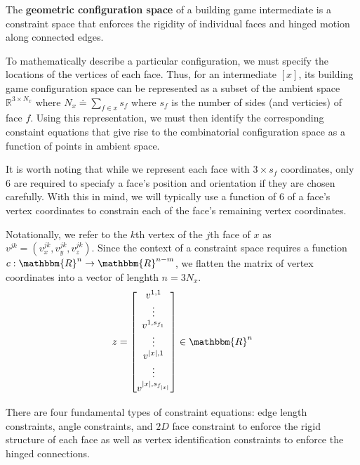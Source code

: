 \begin{mydef}
The \textbf{geometric configuration space} of a building game intermediate is a constraint space that enforces the rigidity of individual faces and hinged motion along connected edges.
\end{mydef}

To mathematically describe a particular configuration, we must specify the locations of the vertices of each face. Thus, for an intermediate $[x]$, its building game configuration space can be represented as a subset of the ambient space $\mathbb{R}^{3\times N_x}$ where $N_x \doteq \sum_{f\in x} s_f$ where $s_f$ is the number of sides (and verticies) of face $f$. Using this representation, we must then identify the corresponding constaint equations that give rise to the combinatorial configuration space as a function of points in ambient space. 

It is worth noting that while we represent each face with $3\times s_f$ coordinates, only 6 are required to speciafy a face's position and orientation if they are chosen carefully. With this in mind, we will typically use a function of $6$ of a face's vertex coordinates to constrain each of the face's remaining vertex coordinates. 


Notationally, we refer to the $k$th vertex of the $j$th face of $x$ as $v^{jk} = \left(v^{jk}_x,v^{jk}_y,v^{jk}_z\right)$.
Since the context of a constraint space requires a function $c: \mathbbm{R}^n \to \mathbbm{R}^{n-m}$, we flatten the matrix of vertex coordinates into a vector of lenghth $n = 3N_x$. 
\begin{align}
z = \begin{bmatrix} v^{1,1} \\ \vdots \\ v^{1,s_{f_1}} \\ \vdots \\ v^{|x|,1} \\ \vdots \\ v^{|x|,s_{f_{|x|}}} \end{bmatrix} \in \mathbbm{R}^n
\end{align}

There are four fundamental types of constraint equations: edge length constraints, angle constraints, and $2D$ face constraint to enforce the rigid structure of each face as well as vertex identification constraints to enforce the hinged connections.

